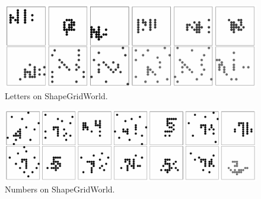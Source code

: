 
\begin{figure}[H]
    \centering
    \includegraphics[width=\textwidth]{images/curation_sgw_letters.pdf}
    \caption{Letters on ShapeGridWorld.}
    \label{fig:curation_sgw_letters}
\end{figure}


\begin{figure}[H]
    \centering
    \includegraphics[width=\textwidth]{images/curation_sgw_numbers.pdf}
    \caption{Numbers on ShapeGridWorld.}
    \label{fig:curation_sgw_numbers}
\end{figure}



